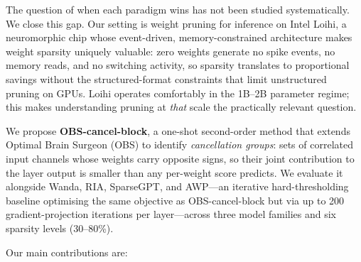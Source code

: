 \documentclass{article}
\begin{document}
The question of when each paradigm wins has not been studied systematically. We close this gap. Our setting is weight pruning for inference on Intel Loihi, a neuromorphic chip whose event-driven, memory-constrained architecture makes weight sparsity uniquely valuable: zero weights generate no spike events, no memory reads, and no switching activity, so sparsity translates to proportional savings without the structured-format constraints that limit unstructured pruning on GPUs. Loihi operates comfortably in the 1B--2B parameter regime; this makes understanding pruning at \emph{that} scale the practically relevant question.

We propose \textbf{OBS-cancel-block}, a one-shot second-order method that extends Optimal Brain Surgeon (OBS) to identify \emph{cancellation groups}: sets of correlated input channels whose weights carry opposite signs, so their joint contribution to the layer output is smaller than any per-weight score predicts. We evaluate it alongside Wanda, RIA, SparseGPT, and AWP---an iterative hard-thresholding baseline optimising the same objective as OBS-cancel-block but via up to 200 gradient-projection iterations per layer---across three model families and six sparsity levels (30--80\%).

Our main contributions are:
\end{document}
